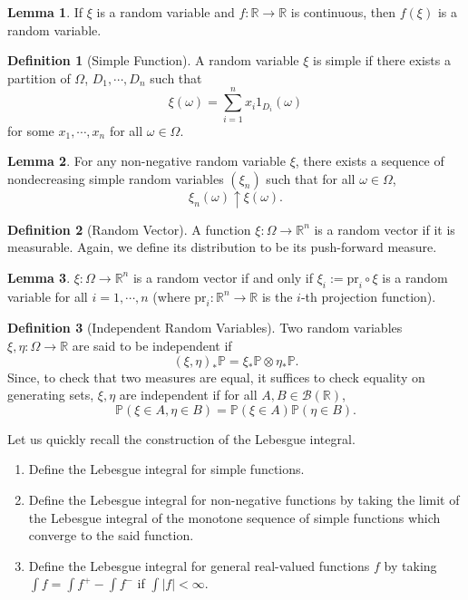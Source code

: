 \documentclass[]{article}
\theoremstyle{definition}
\theoremstyle{definition}
\newtheorem{definition}{Definition}[section]
\newtheorem{lemma}{Lemma}[section]
\begin{document}
\begin{lemma}
  If \(\xi\) is a random variable and \(f : \mathbb{R} \to \mathbb{R}\) is continuous, 
  then \(f(\xi)\) is a random variable.
\end{lemma}

\begin{definition}[Simple Function]
  A random variable \(\xi\) is simple if there exists a partition of \(\Omega\), 
  \(D_1, \cdots, D_n\) such that 
  \[\xi(\omega) = \sum_{i = 1}^n x_i 1_{D_i}(\omega)\]
  for some \(x_1, \cdots, x_n\) for all \(\omega \in \Omega\).
\end{definition}

\begin{lemma}
  For any non-negative random variable \(\xi\), there exists a sequence of 
  nondecreasing simple random variables \((\xi_n)\) such that for all \(\omega \in \Omega\),
  \[\xi_n(\omega) \uparrow \xi(\omega).\]
\end{lemma}

\begin{definition}[Random Vector]
  A function \(\xi : \Omega \to \mathbb{R}^n\) is a random vector if it is 
  measurable. Again, we define its distribution to be its push-forward measure.
\end{definition}

\begin{lemma}
  \(\xi : \Omega \to \mathbb{R}^n\) is a random vector if and only if 
  \(\xi_i := \text{pr}_i \circ \xi\) is a random variable for all \(i = 1, \cdots, n\)
  (where \(\text{pr}_i : \mathbb{R}^n \to \mathbb{R}\) is the \(i\)-th projection function).
\end{lemma}

\begin{definition}[Independent Random Variables]
  Two random variables \(\xi, \eta : \Omega \to \mathbb{R}\) are said to be 
  independent if 
  \[(\xi, \eta)_* \mathbb{P} = \xi_* \mathbb{P} \otimes \eta_* \mathbb{P}.\]
  Since, to check that two measures are equal, it suffices to check equality on 
  generating sets, \(\xi, \eta\) are independent if for all \(A, B \in \mathcal{B}(\mathbb{R})\),
  \[\mathbb{P}(\xi \in A, \eta \in B) = \mathbb{P}(\xi \in A) \mathbb{P}(\eta \in B).\]
\end{definition}

Let us quickly recall the construction of the Lebesgue integral. 
\begin{enumerate}
  \item Define the Lebesgue integral for simple functions.
  \item Define the Lebesgue integral for non-negative functions by taking the limit 
    of the Lebesgue integral of the monotone sequence of simple functions which converge 
    to the said function.
  \item Define the Lebesgue integral for general real-valued functions \(f\) by 
    taking \(\int f = \int f^+ - \int f^-\) if \(\int |f| < \infty\).
\end{enumerate}
\end{document}

